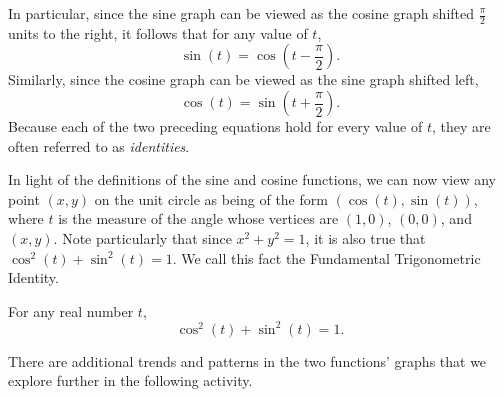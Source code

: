 \documentclass[nooutcomes]{ximera}
\begin{document}
In particular, since the sine graph can be viewed as the cosine graph shifted \(\frac{\pi}{2}\) units to the right, it follows that for any value of \(t\),%
\begin{equation*}
\sin(t) = \cos\left(t-\frac{\pi}{2}\right)\text{.}
\end{equation*}
Similarly, since the cosine graph can be viewed as the sine graph shifted left,%
\begin{equation*}
\cos(t) = \sin\left(t + \frac{\pi}{2}\right)\text{.}
\end{equation*}
Because each of the two preceding equations hold for every value of \(t\), they are often referred to as \emph{identities}.%
\par
\hypertarget{p-1054}{}%
In light of the definitions of the sine and cosine functions, we can now view any point \((x,y)\) on the unit circle as being of the form \((\cos(t),\sin(t))\), where \(t\) is the measure of the angle whose vertices are \((1,0)\), \((0,0)\), and \((x,y)\).  Note particularly that since \(x^2 + y^2 = 1\), it is also true that \(\cos^2(t) + \sin^2(t) = 1\).  We call this fact the Fundamental Trigonometric Identity.%

\begin{callout}
For any real number \(t\),%
\begin{equation*}
\cos^2(t) + \sin^2(t) = 1\text{.}
\end{equation*}
\end{callout}

There are additional trends and patterns in the two functions' graphs that we explore further in the following activity.
\end{document}
